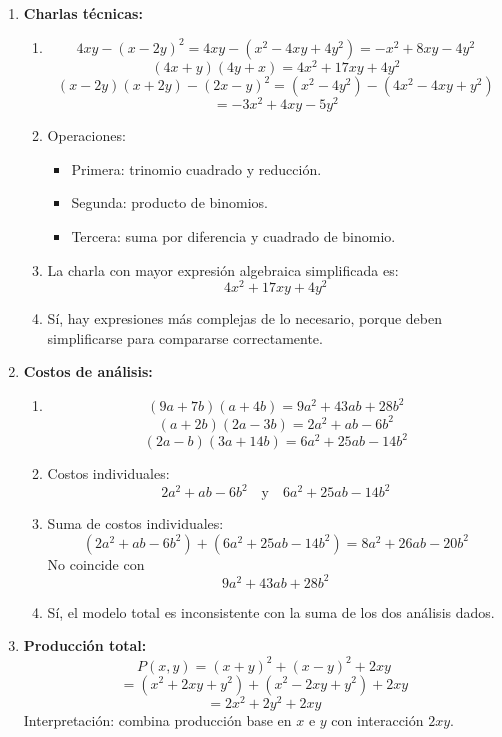 \documentclass[12pt]{article}
\begin{document}
\begin{enumerate}
	\item \textbf{Charlas técnicas:}
	\begin{enumerate}[label=\alph*)]
		\item 
		\[
		4xy-(x-2y)^2=4xy-(x^2-4xy+4y^2)=-x^2+8xy-4y^2
		\]
		\[
		(4x+y)(4y+x)=4x^2+17xy+4y^2
		\]
		\[
		(x-2y)(x+2y)-(2x-y)^2=(x^2-4y^2)-(4x^2-4xy+y^2)
		\]
		\[
		=-3x^2+4xy-5y^2
		\]
		
		\item Operaciones:
		\begin{itemize}
			\item Primera: trinomio cuadrado y reducción.
			\item Segunda: producto de binomios.
			\item Tercera: suma por diferencia y cuadrado de binomio.
		\end{itemize}
		
		\item La charla con mayor expresión algebraica simplificada es:
		\[
		4x^2+17xy+4y^2
		\]
		
		\item Sí, hay expresiones más complejas de lo necesario, porque deben simplificarse para compararse correctamente.
	\end{enumerate}
	
	\item \textbf{Costos de análisis:}
	\begin{enumerate}[label=\alph*)]
		\item
		\[
		(9a+7b)(a+4b)=9a^2+43ab+28b^2
		\]
		\[
		(a+2b)(2a-3b)=2a^2+ab-6b^2
		\]
		\[
		(2a-b)(3a+14b)=6a^2+25ab-14b^2
		\]
		
		\item Costos individuales:
		\[
		2a^2+ab-6b^2 \quad \text{y} \quad 6a^2+25ab-14b^2
		\]
		
		\item Suma de costos individuales:
		\[
		(2a^2+ab-6b^2)+(6a^2+25ab-14b^2)=8a^2+26ab-20b^2
		\]
		No coincide con
		\[
		9a^2+43ab+28b^2
		\]
		
		\item Sí, el modelo total es inconsistente con la suma de los dos análisis dados.
	\end{enumerate}
	
	\item \textbf{Producción total:}
	\[
	P(x,y)=(x+y)^2+(x-y)^2+2xy
	\]
	\[
	=(x^2+2xy+y^2)+(x^2-2xy+y^2)+2xy
	\]
	\[
	=2x^2+2y^2+2xy
	\]
	Interpretación: combina producción base en $x$ e $y$ con interacción $2xy$.
	

\end{enumerate}
\end{document}

